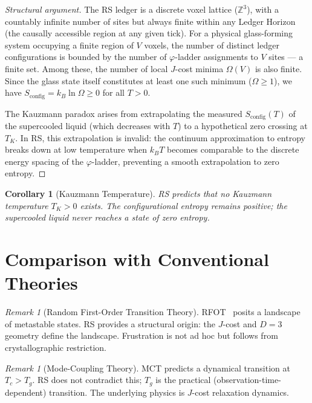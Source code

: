 \documentclass[12pt,a4paper]{article}
\newtheorem{corollary}[theorem]{Corollary}
\theoremstyle{definition}
\theoremstyle{remark}
\newtheorem{remark}[theorem]{Remark}
\begin{document}
\begin{proof}[Structural argument]
The RS ledger is a discrete voxel lattice ($\mathbb{Z}^3$), with a
countably infinite number of sites but always finite within any
Ledger Horizon (the causally accessible region at any given tick).
For a physical glass-forming system occupying a finite region of
$V$ voxels, the number of distinct ledger configurations is bounded
by the number of $\varphi$-ladder assignments to $V$ sites --- a
finite set.  Among these, the number of local $J$-cost minima
$\Omega(V)$ is also finite.  Since the glass state itself constitutes
at least one such minimum ($\Omega \geq 1$), we have
$S_{\mathrm{config}} = k_B \ln \Omega \geq 0$ for all $T > 0$.

The Kauzmann paradox arises from extrapolating the measured
$S_{\mathrm{config}}(T)$ of the supercooled liquid (which decreases
with $T$) to a hypothetical zero crossing at $T_K$.  In RS, this
extrapolation is invalid: the continuum approximation to entropy
breaks down at low temperature when $k_BT$ becomes comparable to
the discrete energy spacing of the $\varphi$-ladder, preventing a
smooth extrapolation to zero entropy.
\end{proof}

\begin{corollary}[Kauzmann Temperature]
RS predicts that no Kauzmann temperature $T_K > 0$ exists.  The
configurational entropy remains positive; the supercooled liquid
never reaches a state of zero entropy.
\end{corollary}

\section{Comparison with Conventional Theories}
\label{sec:comparison}

\begin{remark}[Random First-Order Transition Theory]
RFOT~\cite{RFOT} posits a landscape of metastable states.  RS
provides a structural origin: the $J$-cost and $D = 3$ geometry
define the landscape.  Frustration is not ad hoc but follows from
crystallographic restriction.
\end{remark}

\begin{remark}[Mode-Coupling Theory]
MCT predicts a dynamical transition at $T_c > T_g$.  RS does not
contradict this; $T_g$ is the practical (observation-time-dependent)
transition.  The underlying physics is $J$-cost relaxation dynamics.
\end{remark}
\end{document}
